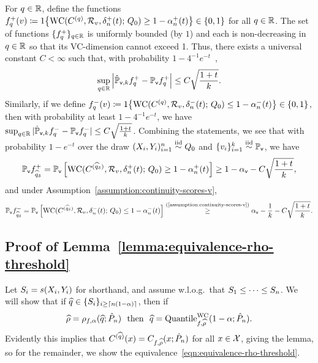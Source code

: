 For $q \in \mathbb{R}$, define the functions $f^+_q(v) \coloneqq
1\!\left\{\textup{WC}(C^{(q)}, \mathcal{R}_v, \delta_n^{+}(t); \, Q_0) \geq 1-
  \alpha_n^{+}(t)\right\} \in \{ 0, 1\}$ for all $q \in \mathbb{R}$.  The set of functions
$\{ f_q^+ \}_{q \in \mathbb{R}}$ is uniformly bounded (by $1$) and each is
non-decreasing in $q \in \mathbb{R}$ so that its VC-dimension cannot exceed 1.
Thus, there exists a universal constant $C < \infty$ such that, with
probability $1- 4^{-1}e^{-t}$~\cite[e.g.][Thm.~4.10,
  Ex.~5.24]{Wainwright19},
\begin{align*}
  \sup_{q \in \mathbb{R}} \left| \hat{\mathbb{P}}_{\mathsf{v},k} f^{+}_q - \mathbb{P}_{\mathsf{v}} f^{+}_q \right| 
  \le C\sqrt{\frac{1+t}{k}}.
\end{align*}
Similarly, if we define $f^-_q(v) \coloneqq 1\!\left\{\textup{WC}(C^{(q)},
  \mathcal{R}_v, \delta_n^{-}(t); \, Q_0) \le 1- \alpha_n^{-}(t)\right\} \in \{ 0, 1\}$, then with probability at least $1-4^{-1}e^{-t}$,
we have $\sup_{q \in \mathbb{R}} | \hat{\mathbb{P}}_{\mathsf{v},k} f^{-}_q - \mathbb{P}_{\mathsf{v}} f^{-}_q| \le
C\sqrt{\frac{1+t}{k}}$.  Combining the statements, we see that with
probability $1-e^{-t}$ over the
draw $(X_i,Y_i)_{i=1}^n \stackrel{\rm iid}{\sim} Q_0$ and $\{v_i \}_{i=1}^k \stackrel{\rm iid}{\sim} \mathbb{P}_{\mathsf{v}}$,
we have
\begin{align*}
  \mathbb{P}_{\mathsf{v}} f^{+}_{\widehat{q}_\delta} = \mathbb{P}_{\mathsf{v}} \left[
    \textup{WC}(C^{(\widehat{q}_\delta)}, \mathcal{R}_v, \delta^{+}_n(t); \, Q_0)
    \ge 1- \alpha^{+}_{n}(t) \right]
  \ge 1- \alpha_{\mathsf{v}} - C\sqrt{\frac{1+t}{k}},
\end{align*}
and under Assumption~\ref{assumption:continuity-scores-v},
\begin{align*}
  \mathbb{P}_{\mathsf{v}} f^{-}_{\widehat{q}_\delta}  = \mathbb{P}_{\mathsf{v}} \left[
    \textup{WC}(C^{(\widehat{q}_\delta)}, \mathcal{R}_v, \delta^{-}_n(t); \, Q_0)
    \le 1- \alpha^{-}_{n}(t)
       \right]
  \stackrel{(\textup{\ref{assumption:continuity-scores-v}})}{\ge}
  \alpha_{\mathsf{v}} - \frac{1}{k} - C\sqrt{\frac{1+t}{k}}.
\end{align*}

\subsection{Proof of Lemma~\ref{lemma:equivalence-rho-threshold}}
\label{sec:proof-equivalence-rho-threshold}

Let $S_i = s(X_i, Y_i)$ for shorthand, and assume
w.l.o.g.\ that $S_1 \le \cdots \le S_n$.
We will show that if $\widehat{q} \in \{S_i\}_{i \ge
  \left\lceil{n(1 - \alpha)}\right\rceil}$, then if
\begin{equation}
  \label{eqn:equivalence-rho-threshold}
  \widehat{\rho} = \rho_{f,\alpha}(\widehat{q}; \hat{P}_n)
  ~~ \mbox{then} ~~
  \widehat{q} = \textup{Quantile}^{\textup{WC}}_{f,\widehat{\rho}}(1 - \alpha; \hat{P}_n).
\end{equation}
Evidently this implies that $C^{(\widehat{q})}(x) = C_{f,\widehat{\rho}}(x;
\hat{P}_n)$ for all $x \in \mathcal{X}$, giving the lemma, so for the remainder, we
show the equivalence~\eqref{eqn:equivalence-rho-threshold}.

